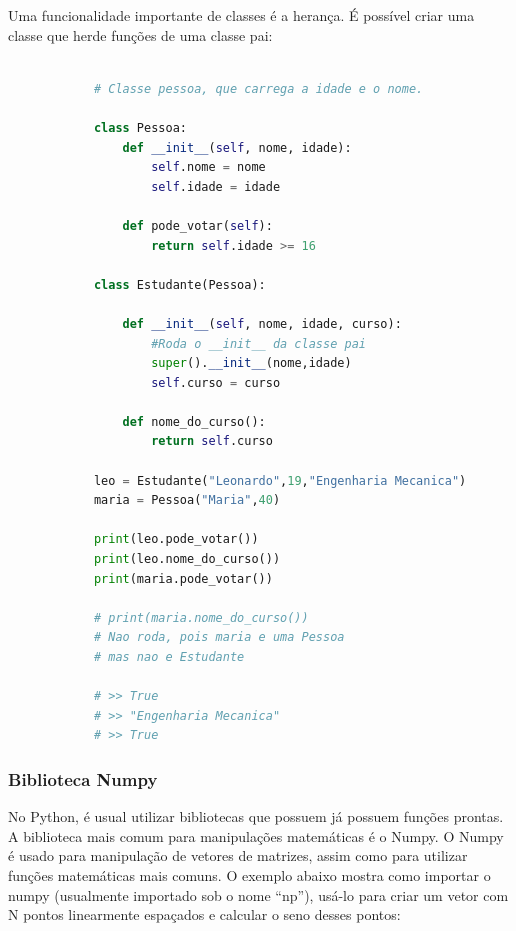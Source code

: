         Uma funcionalidade importante de classes é a herança. É possível criar uma classe que herde funções de uma classe pai:

        \begin{lstlisting}[language=Python]
            
            # Classe pessoa, que carrega a idade e o nome.

            class Pessoa:
                def __init__(self, nome, idade):
                    self.nome = nome
                    self.idade = idade

                def pode_votar(self):
                    return self.idade >= 16
            
            class Estudante(Pessoa):

                def __init__(self, nome, idade, curso):
                    #Roda o __init__ da classe pai
                    super().__init__(nome,idade) 
                    self.curso = curso
                
                def nome_do_curso():
                    return self.curso

            leo = Estudante("Leonardo",19,"Engenharia Mecanica")
            maria = Pessoa("Maria",40)
            
            print(leo.pode_votar())
            print(leo.nome_do_curso())
            print(maria.pode_votar())

            # print(maria.nome_do_curso())
            # Nao roda, pois maria e uma Pessoa
            # mas nao e Estudante

            # >> True
            # >> "Engenharia Mecanica"
            # >> True

        \end{lstlisting}
        
        \subsubsection*{Biblioteca Numpy}

        No Python, é usual utilizar bibliotecas que possuem já possuem funções prontas. A biblioteca mais comum para manipulações matemáticas é o Numpy. O Numpy é usado para manipulação de vetores de matrizes, assim como para utilizar funções matemáticas mais comuns. O exemplo abaixo mostra como importar o numpy (usualmente importado sob o nome ``np''), usá-lo para criar um vetor com N pontos linearmente espaçados e calcular o seno desses pontos:

